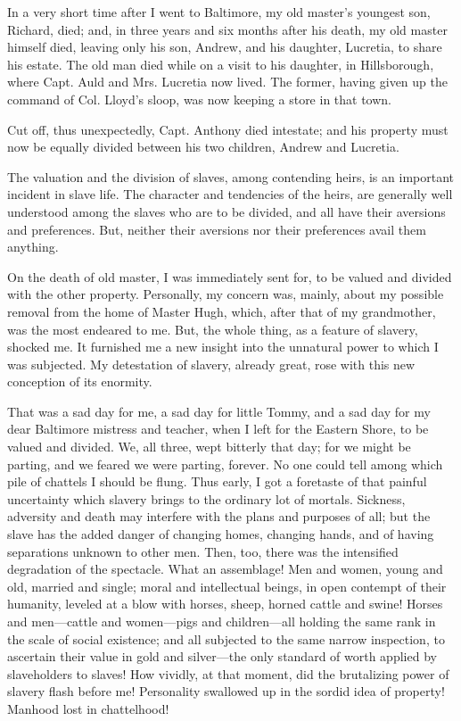 In a very short time after I went to Baltimore, my old master's youngest
son, Richard, died; and, in {\protect\hypertarget{174}{}{}}three years
and six months after his death, my old master himself died, leaving only
his son, Andrew, and his daughter, Lucretia, to share his estate. The
old man died while on a visit to his daughter, in Hillsborough, where
Capt. Auld and Mrs. Lucretia now lived. The former, having given up the
command of Col. Lloyd's sloop, was now keeping a store in that town.

Cut off, thus unexpectedly, Capt. Anthony died intestate; and his
property must now be equally divided between his two children, Andrew
and Lucretia.

The valuation and the division of slaves, among contending heirs, is an
important incident in slave life. The character and tendencies of the
heirs, are generally well understood among the slaves who are to be
divided, and all have their aversions and preferences. But, neither
their aversions nor their preferences avail them anything.

On the death of old master, I was immediately sent for, to be valued and
divided with the other property. Personally, my concern was, mainly,
about my possible removal from the home of Master Hugh, which, after
that of my grandmother, was the most endeared to me. But, the whole
thing, as a feature of slavery, shocked me. It furnished me a new
insight into the unnatural power to which I was subjected. My
detestation of slavery, already great, rose with this new conception of
its enormity.

That was a sad day for me, a sad day for little Tommy, and a sad day for
my dear Baltimore mistress and teacher, when I left for the Eastern
Shore, to be valued and divided. We, all three, wept bitterly that
{\protect\hypertarget{175}{}{}}day; for we might be parting, and we
feared we were parting, forever. No one could tell among which pile of
chattels I should be flung. Thus early, I got a foretaste of that
painful uncertainty which slavery brings to the ordinary lot of mortals.
Sickness, adversity and death may interfere with the plans and purposes
of all; but the slave has the added danger of changing homes, changing
hands, and of having separations unknown to other men. Then, too, there
was the intensified degradation of the spectacle. What an assemblage!
Men and women, young and old, married and single; moral and intellectual
beings, in open contempt of their humanity, leveled at a blow with
horses, sheep, horned cattle and swine! Horses and men---cattle and
women---pigs and children---all holding the same rank in the scale of
social existence; and all subjected to the same narrow inspection, to
ascertain their value in gold and silver---the only standard of worth
applied by slaveholders to slaves! How vividly, at that moment, did the
brutalizing power of slavery flash before me! Personality swallowed up
in the sordid idea of property! Manhood lost in chattelhood!

